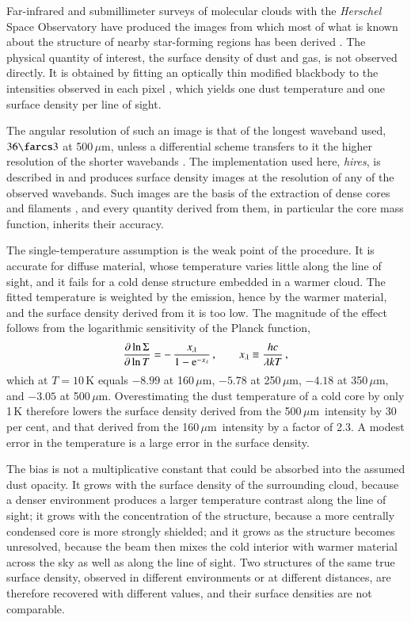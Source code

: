 \documentclass{aa}
\newcommand{\um}{\,$\mu$m}
\begin{document}
Far-infrared and submillimeter surveys of molecular clouds with the
\emph{Herschel} Space Observatory have produced the images from which most of
what is known about the structure of nearby star-forming regions has been
derived \citep[e.g.][]{Andre+2010, Konyves+2015, Andre+2014}. The physical
quantity of interest, the surface density of dust and gas, is not observed
directly. It is obtained by fitting an optically thin modified blackbody to the
intensities observed in each pixel \citep{Hildebrand1983}, which yields one
dust temperature and one surface density per line of sight.

The angular resolution of such an image is that of the longest waveband used,
$36\farcs3$ at 500\um, unless a differential scheme transfers to it the higher
resolution of the shorter wavebands \citep{Palmeirim+2013}. The implementation
used here, \emph{hires}, is described in
\citet[][Appendix~A]{Menshchikov2021method} and produces surface density images
at the resolution of any of the observed wavebands. Such images are the basis
of the extraction of dense cores and filaments
\citep{Menshchikov2021, Konyves+2015}, and every quantity derived from them, in
particular the core mass function, inherits their accuracy.

The single-temperature assumption is the weak point of the procedure. It is
accurate for diffuse material, whose temperature varies little along the line
of sight, and it fails for a cold dense structure embedded in a warmer cloud.
The fitted temperature is weighted by the emission, hence by the warmer
material, and the surface density derived from it is too low. The magnitude of
the effect follows from the logarithmic sensitivity of the Planck function,
%
\begin{equation}
   \frac{\partial \ln \Sigma}{\partial \ln T} =
   -\,\frac{x_\lambda}{1-{\rm e}^{-x_\lambda}}\,,
   \qquad x_\lambda \equiv \frac{h c}{\lambda k T}\,,
   \label{eq:sensitivity}
\end{equation}
%
which at $T = 10$\,K equals $-8.99$ at 160\um, $-5.78$ at 250\um, $-4.18$ at
350\um, and $-3.05$ at 500\um. Overestimating the dust temperature of a cold
core by only 1\,K therefore lowers the surface density derived from the
500\um\ intensity by 30\,per cent, and that derived from the 160\um\ intensity
by a factor of 2.3. A modest error in the temperature is a large error in the
surface density.

The bias is not a multiplicative constant that could be absorbed into the
assumed dust opacity. It grows with the surface density of the surrounding
cloud, because a denser environment produces a larger temperature contrast
along the line of sight; it grows with the concentration of the structure,
because a more centrally condensed core is more strongly shielded; and it grows
as the structure becomes unresolved, because the beam then mixes the cold
interior with warmer material across the sky as well as along the line of
sight. Two structures of the same true surface density, observed in different
environments or at different distances, are therefore recovered with different
values, and their surface densities are not comparable.
\end{document}

